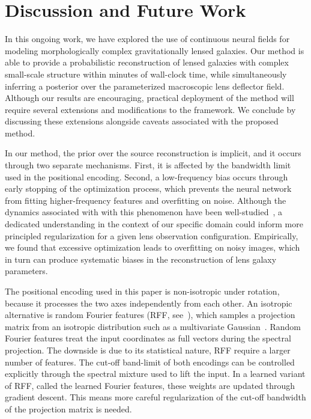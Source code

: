 \documentclass[nohyperref]{article}
\theoremstyle{plain}
\theoremstyle{definition}
\theoremstyle{remark}
\begin{document}
\section{Discussion and Future Work}
\label{sec:discussion}

In this ongoing work, we have explored the use of continuous neural fields for modeling morphologically complex gravitationally lensed galaxies. Our method is able to provide a probabilistic reconstruction of lensed galaxies with complex small-scale structure within minutes of wall-clock time, while simultaneously inferring a posterior over the parameterized macroscopic lens deflector field. Although our results are encouraging, practical deployment of the method will require several extensions and modifications to the framework. We conclude by discussing these extensions alongside caveats associated with the proposed method.

In our method, the prior over the source reconstruction is implicit, and it occurs through two separate mechanisms. First, it is affected by the bandwidth limit used in the positional encoding. Second, a low-frequency bias occurs through early stopping of the optimization process, which prevents the neural network from fitting higher-frequency features and overfitting on noise. Although the dynamics associated with with this phenomenon have been well-studied~\citep{roberts2022deep-learning}, a dedicated understanding in the context of our specific domain could inform more principled regularization for a given lens observation configuration. Empirically, we found that excessive optimization leads to overfitting on noisy images, which in turn can produce systematic biases in the reconstruction of lens galaxy parameters.

The positional encoding used in this paper is non-isotropic under rotation, because it processes the two axes independently from each other. An isotropic alternative is random Fourier features (RFF, see~\citet{Rahimi2008kitchen}), which samples a projection matrix from an isotropic distribution such as a multivariate Gaussian~\cite{yang2022overcoming}. Random Fourier features treat the input coordinates as full vectors during the spectral projection. The downside is due to its statistical nature, RFF require a larger number of features. The cut-off band-limit of both encodings can be controlled explicitly through the spectral mixture used to lift the input. In a learned variant of RFF, called the learned Fourier features, these weights are updated through gradient descent. This means more careful regularization of the cut-off bandwidth of the projection matrix is needed.
\end{document}

